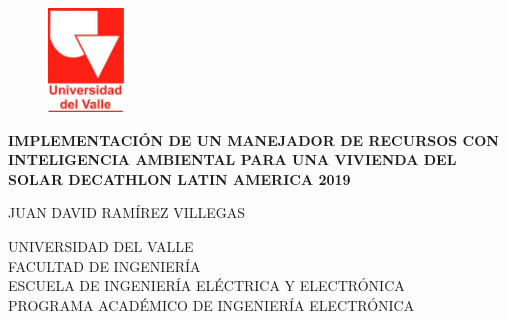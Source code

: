 \pagestyle{empty}
\begin{center}

\begin{figure}[htbp]
	\centering
		\includegraphics[width=2cm]{figuras/uv_logo.png}
	\label{Logo_UV}
\end{figure}

\vspace{2cm}

\textbf{\large{IMPLEMENTACI\'ON DE UN MANEJADOR DE RECURSOS CON INTELIGENCIA AMBIENTAL PARA UNA VIVIENDA DEL SOLAR DECATHLON LATIN AMERICA 2019}}

\vspace{4cm}

\large{
JUAN DAVID RAMÍREZ VILLEGAS
}

\vspace{4cm}

\large{UNIVERSIDAD DEL VALLE}\\
\large{FACULTAD DE INGENIERÍA}\\
\large{ESCUELA DE INGENIERÍA ELÉCTRICA Y ELECTRÓNICA}\\
\large{PROGRAMA ACADÉMICO DE INGENIERÍA ELECTRÓNICA}\\
\large{\Today}


\vspace{4cm}

\end{center}
\newpage